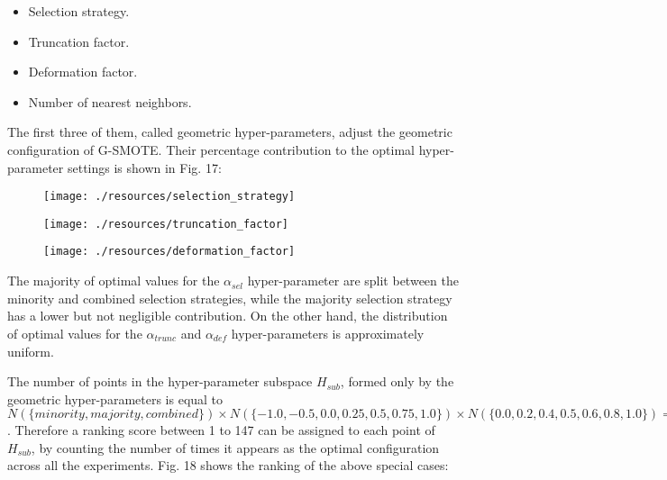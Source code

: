\documentclass[parskip=full]{scrartcl}
\begin{document}
\begin{itemize}
	
	\renewcommand\labelitemi{--}

	\item Selection strategy.

	\item Truncation factor.

	\item Deformation factor.

	\item Number of nearest neighbors.

\end{itemize}

 The first three of them, called geometric hyper-parameters, adjust the
 geometric configuration of G-SMOTE. Their percentage contribution to the
 optimal hyper-parameter settings is shown in Fig. 17:

\begin{figure}[H]
	\centering
	\texttt{[image: ./resources/selection\_strategy]}
\end{figure}

\begin{figure}[H]
	\centering
	\texttt{[image: ./resources/truncation\_factor]}
\end{figure}

\begin{figure}[H]
	\centering
	\texttt{[image: ./resources/deformation\_factor]}
\end{figure}

The majority of optimal values for the \( \alpha_{sel} \) hyper-parameter are
split between the minority and combined selection strategies, while the majority
selection strategy has a lower but not negligible contribution. On the other
hand, the distribution of optimal values for the \( \alpha_{trunc} \) and \(
\alpha_{def} \) hyper-parameters is approximately uniform.

The number of points in the hyper-parameter subspace \( H_{sub} \), formed only
by the geometric hyper-parameters is equal to $N(\{ minority, majority, combined
\}) \times N(\{ -1.0, -0.5, 0.0, 0.25, 0.5, 0.75 , 1.0 \}) \times N(\{ 0.0, 0.2,
0.4, 0.5, 0.6, 0.8, 1.0 \}) = 147$. Therefore a ranking score between 1 to 147
can be assigned to each point of \( H_{sub} \), by counting the number of times
it appears as the optimal configuration across all the experiments. Fig. 18
shows the ranking of the above special cases:
\end{document}

